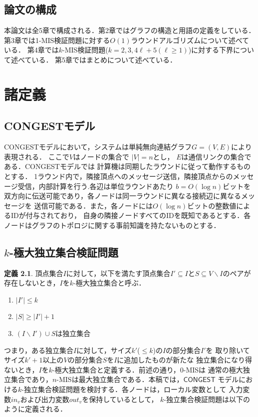 \documentclass[12pt]{thesis}
\newcommand{\CONGEST}{\textsf{CONGEST}}
\newcommand{\Inp}{\mathit{in}}
\newcommand{\Out}{\mathit{out}}
\theoremstyle{definition}
\newtheorem{definition}{定義}[chapter]
\begin{document}
\section{論文の構成}
本論文は全5章で構成される．第2章ではグラフの構造と用語の定義をしている．
第3章では1-MIS検証問題に対する$O(1)$ラウンドアルゴリズムについて述べている．
第4章では$k$-MIS検証問題($k = 2, 3, 4\ell + 5 (\ell \geq 1)$)に対する下界について述べている．
第5章ではまとめについて述べている．

\chapter{諸定義}

\section{{\CONGEST}モデル}
{\CONGEST}モデルにおいて，システムは単純無向連結グラフ$G =  (V,E)$により表現される．
ここで$V$はノードの集合で $|V| = n$とし， $E$は通信リンクの集合である．{\CONGEST}モデルでは
計算機は同期したラウンドに従って動作するものとする．
1ラウンド内で，隣接頂点へのメッセージ送信，隣接頂点からのメッセージ受信，内部計算を行う.各辺は単位ラウンドあたり
$b = O(\log n)$ビットを双方向に伝送可能であり，各ノードは同一ラウンドに異なる接続辺に異なるメッセージを
送信可能である．また，各ノードには$O(\log n)$ビットの整数値によるIDが付与されており，
自身の隣接ノードすべてのIDを既知であるとする．各ノードはグラフのトポロジに関する事前知識を持たないものとする．

\section{$k$-極大独立集合検証問題}
\begin{definition}
頂点集合$I$に対して，以下を満たす頂点集合$I' \subseteq I$と$S\subseteq V \backslash I$のペアが
存在しないとき，$I$を$k$-極大独立集合と呼ぶ．
\begin{enumerate}
\item $|I'| \leq k$
\item $|S| \geq |I'| + 1$
\item $(I \backslash I') \cup S$は独立集合
\end{enumerate}
\end{definition}
つまり，ある独立集合$I$に対して，サイズ$k'$($\leq k$)の$I$の部分集合$I'$を
取り除いてサイズ$k' + 1$以上の$V$の部分集合$S$を$I$に追加したものが新たな
独立集合になり得ないとき，$I$を$k$-極大独立集合と定義する．前述の通り，$0$-MISは
通常の極大独立集合であり，$n$-MISは最大独立集合である．本稿では，${\CONGEST}$
モデルにおける$k$-独立集合検証問題を検討する．各ノードは，ローカル変数として
入力変数$\Inp_v$および出力変数$\Out_v$を保持しているとして，
$k$-独立集合検証問題は以下のように定義される．
\end{document}
